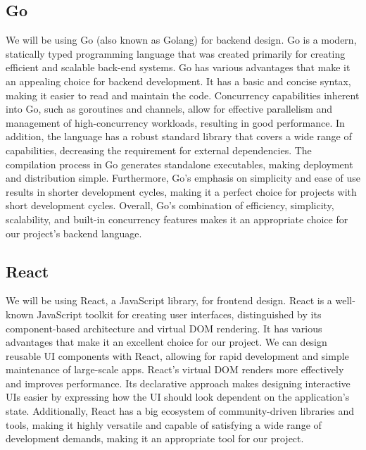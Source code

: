 \documentclass[titlepage]{article}
\begin{document}
\subsection{Go}
We will be using Go (also known as Golang) for backend design. Go is a modern, statically typed programming language that was created primarily for creating efficient and scalable back-end systems. Go has various advantages that make it an appealing choice for backend development. It has a basic and concise syntax, making it easier to read and maintain the code. Concurrency capabilities inherent into Go, such as goroutines and channels, allow for effective parallelism and management of high-concurrency workloads, resulting in good performance. In addition, the language has a robust standard library that covers a wide range of capabilities, decreasing the requirement for external dependencies. The compilation process in Go generates standalone executables, making deployment and distribution simple. Furthermore, Go's emphasis on simplicity and ease of use results in shorter development cycles, making it a perfect choice for projects with short development cycles. Overall, Go's combination of efficiency, simplicity, scalability, and built-in concurrency features makes it an appropriate choice for our project's backend language.

\subsection{React}
We will be using React, a JavaScript library, for frontend design. React is a well-known JavaScript toolkit for creating user interfaces, distinguished by its component-based architecture and virtual DOM rendering. It has various advantages that make it an excellent choice for our project. We can design reusable UI components with React, allowing for rapid development and simple maintenance of large-scale apps. React's virtual DOM renders more effectively and improves performance. Its declarative approach makes designing interactive UIs easier by expressing how the UI should look dependent on the application's state. Additionally, React has a big ecosystem of community-driven libraries and tools, making it highly versatile and capable of satisfying a wide range of development demands, making it an appropriate tool for our project.
\end{document}
